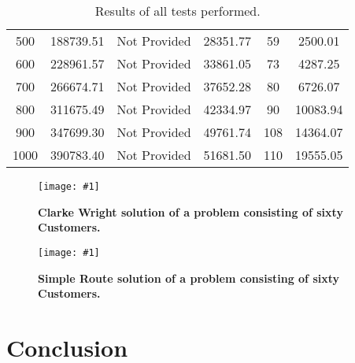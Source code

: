 \documentclass[conference]{acmsiggraph}
\newcommand{\figuremacroW}[4]{
	\begin{figure}[h] %
		\centering
		\texttt{[image: \#1]}
		\caption[#2]{\textbf{#2}  #3}
		\label{fig:#1}
	\end{figure}
}
\begin{document}
\begin{table}[h]
{{\begin{minipage}{\textwidth}
\begin{tabular}{cccccc}
				500                 & 188739.51            & Not Provided       & 28351.77          & 59              & 2500.01             \\
				600                 & 228961.57            & Not Provided       & 33861.05          & 73              & 4287.25             \\
				700                 & 266674.71            & Not Provided       & 37652.28          & 80              & 6726.07             \\
				800                 & 311675.49            & Not Provided       & 42334.97          & 90              & 10083.94            \\
				900                 & 347699.30            & Not Provided       & 49761.74          & 108             & 14364.07            \\
				1000                & 390783.40            & Not Provided       & 51681.50          & 110             & 19555.05           
			\end{tabular}
			\caption[Table caption text]{Results of all tests performed.}
			\label{table:name}
			\end{minipage}}
		}
		\end{table}
		\clearpage
		
		\figuremacroW
		{cw60}
		{Clarke Wright solution of a problem consisting of  sixty Customers.}
		{}
		{0.75}
		
		\figuremacroW
		{sr60}
		{Simple Route solution of a problem consisting of  sixty Customers.}
		{}
		{0.75}	
	
	\section{Conclusion}
\end{document}
